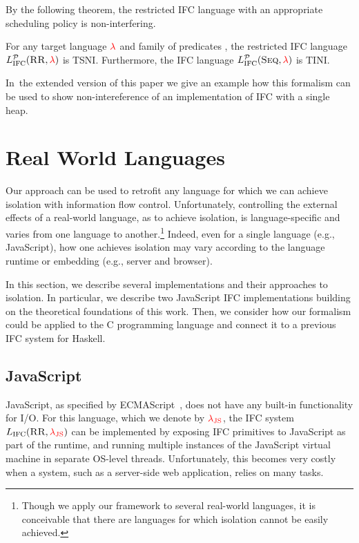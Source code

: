 \documentclass{llncs}
\newif\ifextended
\newcommand{\Red}[1]{{\color{red} #1}}
\newcommand{\appref}[1]{\ifextended Appendix~\ref{#1}\else the extended version of this paper\fi }
\begin{document}
By the following theorem, the restricted IFC language with an
appropriate scheduling policy is non-interfering.

\begin{theorem}
  \label{thm:restricted}
  For any target language \ensuremath{\Red{\lambda}} and family of predicates
  , the restricted IFC language \ensuremath{L_\text{IFC}^{\mathcal{P}}(\textsc{RR},\Red{\lambda})}
  is TSNI.  Furthermore, the IFC language
  \ensuremath{L_\text{IFC}^{\mathcal{P}}(\textsc{Seq},\Red{\lambda})} is TINI.
\end{theorem}

In~\appref{sec:single-heap} we give an example how this formalism can be used
to show non-intereference of an implementation of IFC with a single heap.
\section{Real World Languages}
\label{sec:real}

Our approach can be used to retrofit any language for which we
can achieve isolation with information flow control.
Unfortunately, controlling the external effects of a real-world
language, as to achieve isolation, is language-specific and varies
from one language to another.\footnote{
  Though we apply our framework to several real-world languages, it is
  conceivable that there are languages for which isolation cannot be
  easily achieved.
}
Indeed, even for a single language (e.g., JavaScript), how one
achieves isolation may vary according to the language runtime or
embedding (e.g., server and browser).


In this section, we describe several implementations and their
approaches to isolation.
In particular, we describe two JavaScript IFC implementations
building on the theoretical foundations of this work.
Then, we consider how our formalism could be applied to the C
programming language and connect it to a previous IFC system for
Haskell.







\subsection{JavaScript}
\label{sec:real:js}

JavaScript, as specified by
ECMAScript~\cite{ecma}, does not have any built-in
functionality for I/O.
For this language, which we denote by \ensuremath{\Red{\lambda_{\text{JS}}}}, the IFC system
\ensuremath{L_\text{IFC}(\textsc{RR},\Red{\lambda_{\text{JS}}})} can be implemented by exposing IFC primitives
to JavaScript as part of the runtime, and running multiple instances
of the JavaScript virtual machine in separate OS-level threads.
Unfortunately, this becomes very costly when a system, such as a
server-side web application, relies on many tasks.
\end{document}
